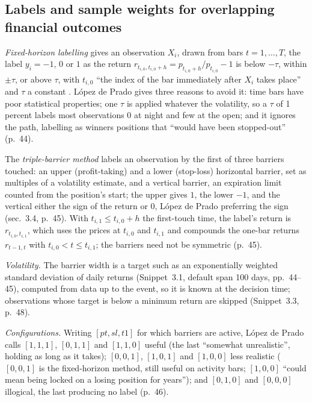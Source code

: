 \subsection{Labels and sample weights for overlapping financial outcomes}

\begin{qfmethod}\label{meth:triple-barrier-labelling}
 \emph{Fixed-horizon labelling} gives an observation $X_i$, drawn from bars $t=1,\dots,T$, the label $y_i=-1$, $0$ or $1$ as the return $r_{t_{i,0},t_{i,0}+h}=p_{t_{i,0}+h}/p_{t_{i,0}}-1$ is below $-\tau$, within $\pm\tau$, or above $\tau$, with $t_{i,0}$ ``the index of the bar immediately after $X_i$ takes place'' and $\tau$ a constant \citep[chap.~3, sec.~3.2, p.~43]{alpha-afml}. López de Prado gives three reasons to avoid it: time bars have poor statistical properties; one $\tau$ is applied whatever the volatility, so a $\tau$ of 1 percent labels most observations 0 at night and few at the open; and it ignores the path, labelling as winners positions that ``would have been stopped-out'' (p.~44).

The \emph{triple-barrier method} labels an observation by the first of three barriers touched: an upper (profit-taking) and a lower (stop-loss) horizontal barrier, set as multiples of a volatility estimate, and a vertical barrier, an expiration limit counted from the position's start; the upper gives $1$, the lower $-1$, and the vertical either the sign of the return or $0$, López de Prado preferring the sign (sec.~3.4, p.~45). With $t_{i,1}\le t_{i,0}+h$ the first-touch time, the label's return is $r_{t_{i,0},t_{i,1}}$, which uses the prices at $t_{i,0}$ and $t_{i,1}$ and compounds the one-bar returns $r_{t-1,t}$ with $t_{i,0}<t\le t_{i,1}$; the barriers need not be symmetric (p.~45).

 \emph{Volatility.} The barrier width is a target such as an exponentially weighted standard deviation of daily returns (Snippet~3.1, default span 100 days, pp.~44--45), computed from data up to the event, so it is known at the decision time; observations whose target is below a minimum return are skipped (Snippet~3.3, p.~48).

\emph{Configurations.} Writing $[pt,sl,t1]$ for which barriers are active, López de Prado calls $[1,1,1]$, $[0,1,1]$ and $[1,1,0]$ useful (the last ``somewhat unrealistic'', holding as long as it takes); $[0,0,1]$, $[1,0,1]$ and $[1,0,0]$ less realistic ($[0,0,1]$ is the fixed-horizon method, still useful on activity bars; $[1,0,0]$ ``could mean being locked on a losing position for years''); and $[0,1,0]$ and $[0,0,0]$ illogical, the last producing no label (p.~46).


\end{qfmethod}
